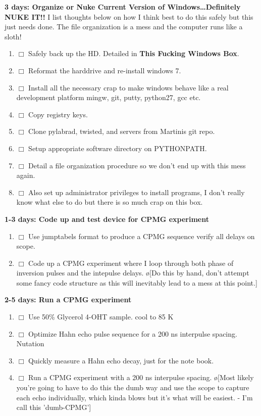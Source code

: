 \documentclass[10pt]{book}
\begin{document}
{\bf 3 days: Organize or Nuke Current Version of Windows\ldots Definitely NUKE IT!!}
I list thoughts below on how I think best to do this safely but this just needs done. The file organization is a mess and the computer runs like a sloth!
\begin{enumerate}
    \item $\Box$ Safely back up the HD. Detailed in {\bf This Fucking Windows Box}.
    \item $\Box$ Reformat the harddrive and re-install windows 7.
    \item $\Box$ Install all the necessary crap to make windows behave like a real development platform mingw, git, putty, python27, gcc etc.
    \item $\Box$ Copy registry keys.
    \item $\Box$ Clone pylabrad, twisted, and servers from Martinis git repo.
    \item $\Box$ Setup appropriate software directory on PYTHONPATH.
    \item $\Box$ Detail a file organization procedure so we don't end up with this mess again.
    \item $\Box$ Also set up administrator privileges to install programs, I don't really know what else to do but there is so much crap on this box.\\
\end{enumerate}


{\bf 1-3 days: Code up and test device for CPMG experiment}
\begin{enumerate}
    \item $\Box$ Use jumptabels format to produce a CPMG sequence verify all delays on scope.
    \item $\Box$ Code up a CPMG experiment where I loop through both phase of inversion pulses and the intepulse delays. \o[Do this by hand, don't attempt some fancy code structure as this will inevitably lead to a mess at this point.]{}\\
\end{enumerate}


{\bf 2-5 days: Run a CPMG experiment}
\begin{enumerate}
    \item $\Box$ Use 50\% Glycerol 4-OHT sample. cool to 85 K
    \item $\Box$ Optimize Hahn echo pulse sequence for a 200 ns interpulse spacing. Nutation
    \item $\Box$ Quickly measure a Hahn echo decay, just for the note book.
    \item $\Box$ Run a CPMG experiment with a 200 ns interpulse spacing. \o[Most likely you're going to have to do this the dumb way and use the scope to capture each echo individually, which kinda blows but it's what will be easiest. - I'm call this 'dumb-CPMG']{}\\
\end{enumerate}
\end{document}
